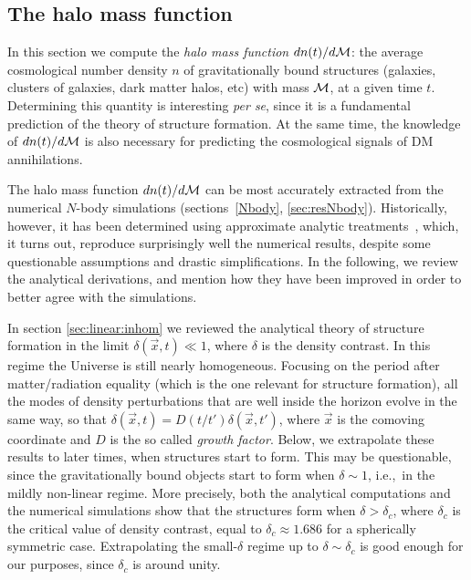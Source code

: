 \subsection{The halo mass function}\label{sec:haloMf}
In this section we compute the {\em halo mass function} $dn(t)/d{\mathcal{M}}$: the average cosmological number density $n$ 
of gravitationally bound structures (galaxies, clusters of galaxies, dark matter halos, etc) with mass ${\mathcal{M}}$, at a given time $t$.
Determining this quantity is interesting {\em per se}, since it is a fundamental prediction of the theory of structure formation. 
At the same time, the knowledge of $dn(t)/d{\mathcal{M}}$ is also necessary for predicting the cosmological signals of DM annihilations.

The halo mass function $dn(t)/d{\mathcal{M}}$ can be most accurately extracted from the numerical $N$-body  simulations (sections~\ref{Nbody}, \ref{sec:resNbody}). 
Historically, however, it has been determined using approximate analytic treatments~\cite{HaloMassFunction}, which, it turns out, reproduce surprisingly well the numerical results, despite some questionable assumptions and drastic simplifications. 
In the following, we review the analytical derivations, and mention how they have been improved in order to better agree with the simulations.

\smallskip

In section \ref{sec:linear:inhom} we reviewed the analytical theory of structure formation
in the limit $\delta(\vec x, t)\ll 1$, where $\delta$ is the density contrast. In this regime the Universe is still nearly homogeneous. Focusing on the period after matter/radiation equality (which is the one relevant for structure formation), all the modes of density perturbations that are well inside the horizon evolve in the same way,
so that $\delta(\vec x,t) = D(t/t') \delta(\vec x, t')$, where $\vec x$ is the comoving coordinate and $D$ is the so called  {\em growth factor}.
Below, we extrapolate these results to later times, when structures start to form. 
This may be questionable, since the gravitationally bound objects start to form when $\delta \sim 1$, i.e.,~in the mildly non-linear regime.
More precisely, both the analytical computations and the numerical simulations show that the structures form when $\delta>\delta_c$, where $\delta_c$ is the critical value of density contrast, equal to $\delta_c \approx 1.686$ for a spherically symmetric case. 
Extrapolating the small-$\delta$ regime up to $\delta\sim\delta_c$ is good enough for our purposes,
since $\delta_c$ is around unity.

